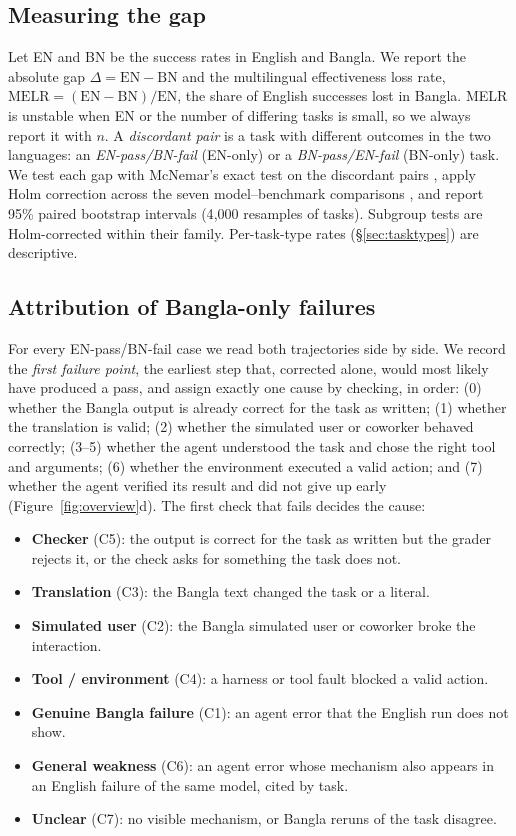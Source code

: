 \documentclass[11pt]{article}
\begin{document}
\subsection{Measuring the gap}
Let EN and BN be the success rates in English and Bangla. We report the absolute gap
$\Delta = \mathrm{EN} - \mathrm{BN}$ and the multilingual effectiveness loss rate,
$\mathrm{MELR} = (\mathrm{EN}-\mathrm{BN})/\mathrm{EN}$, the share of English successes lost in
Bangla. MELR is unstable when EN or the number of differing tasks is small, so we always report it
with $n$. A \emph{discordant pair} is a task with different outcomes in the two languages: an
\emph{EN-pass/BN-fail} (EN-only) or a \emph{BN-pass/EN-fail} (BN-only) task. We test each gap
with McNemar's exact test on the discordant pairs \citep{mcnemar1947}, apply Holm correction
across the seven model--benchmark comparisons \citep{holm1979}, and report 95\% paired bootstrap
intervals (4{,}000 resamples of tasks). Subgroup tests are Holm-corrected within their family.
Per-task-type rates (\S\ref{sec:tasktypes}) are descriptive.

\subsection{Attribution of Bangla-only failures}
\label{sec:attribution}
For every EN-pass/BN-fail case we read both trajectories side by side. We record the \emph{first
failure point}, the earliest step that, corrected alone, would most likely have produced a pass,
and assign exactly one cause by checking, in order: (0) whether the Bangla output is already
correct for the task as written; (1) whether the translation is valid; (2) whether the simulated
user or coworker behaved correctly; (3--5) whether the agent understood the task and chose the
right tool and arguments; (6) whether the environment executed a valid action; and (7) whether the
agent verified its result and did not give up early (Figure~\ref{fig:overview}d). The first check
that fails decides the cause:

\begin{itemize}[noitemsep,topsep=1pt,leftmargin=*]
\item \textbf{Checker} (C5): the output is correct for the task as written but the grader rejects
it, or the check asks for something the task does not.
\item \textbf{Translation} (C3): the Bangla text changed the task or a literal.
\item \textbf{Simulated user} (C2): the Bangla simulated user or coworker broke the interaction.
\item \textbf{Tool / environment} (C4): a harness or tool fault blocked a valid action.
\item \textbf{Genuine Bangla failure} (C1): an agent error that the English run does not show.
\item \textbf{General weakness} (C6): an agent error whose mechanism also appears in an English
failure of the same model, cited by task.
\item \textbf{Unclear} (C7): no visible mechanism, or Bangla reruns of the task disagree.
\end{itemize}
\end{document}
